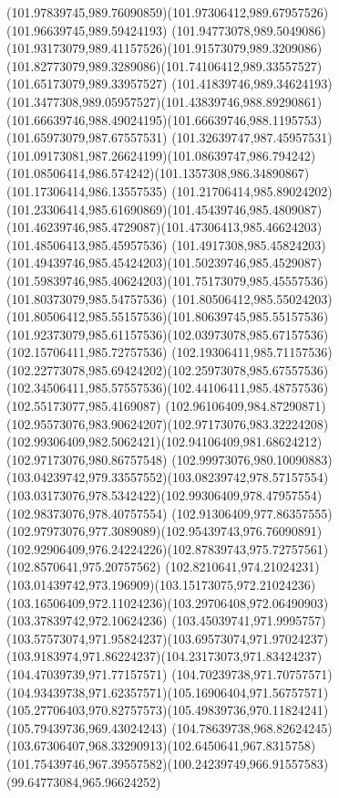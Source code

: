 {{  \curveto(101.97839745,989.76090859)(101.97306412,989.67957526)(101.96639745,989.59424193)
  \curveto(101.94773078,989.5049086)(101.93173079,989.41157526)(101.91573079,989.3209086)
  \curveto(101.82773079,989.3289086)(101.74106412,989.33557527)(101.65173079,989.33957527)
  \curveto(101.41839746,989.34624193)(101.3477308,989.05957527)(101.43839746,988.89290861)
  \curveto(101.66639746,988.49024195)(101.66639746,988.1195753)(101.65973079,987.67557531)
  \curveto(101.32639747,987.45957531)(101.09173081,987.26624199)(101.08639747,986.794242)
  \curveto(101.08506414,986.574242)(101.1357308,986.34890867)(101.17306414,986.13557535)
  \curveto(101.21706414,985.89024202)(101.23306414,985.61690869)(101.45439746,985.4809087)
  \curveto(101.46239746,985.4729087)(101.47306413,985.46624203)(101.48506413,985.45957536)
  \curveto(101.4917308,985.45824203)(101.49439746,985.45424203)(101.50239746,985.4529087)
  \curveto(101.59839746,985.40624203)(101.75173079,985.45557536)(101.80373079,985.54757536)
  \curveto(101.80506412,985.55024203)(101.80506412,985.55157536)(101.80639745,985.55157536)
  \curveto(101.92373079,985.61157536)(102.03973078,985.67157536)(102.15706411,985.72757536)
  \curveto(102.19306411,985.71157536)(102.22773078,985.69424202)(102.25973078,985.67557536)
  \curveto(102.34506411,985.57557536)(102.44106411,985.48757536)(102.55173077,985.4169087)
  \curveto(102.96106409,984.87290871)(102.95573076,983.90624207)(102.97173076,983.32224208)
  \curveto(102.99306409,982.5062421)(102.94106409,981.68624212)(102.97173076,980.86757548)
  \curveto(102.99973076,980.10090883)(103.04239742,979.33557552)(103.08239742,978.57157554)
  \curveto(103.03173076,978.5342422)(102.99306409,978.47957554)(102.98373076,978.40757554)
  \curveto(102.91306409,977.86357555)(102.97973076,977.3089089)(102.95439743,976.76090891)
  \curveto(102.92906409,976.24224226)(102.87839743,975.72757561)(102.8570641,975.20757562)
  \curveto(102.8210641,974.21024231)(103.01439742,973.196909)(103.15173075,972.21024236)
  \curveto(103.16506409,972.11024236)(103.29706408,972.06490903)(103.37839742,972.10624236)
  \curveto(103.45039741,971.9995757)(103.57573074,971.95824237)(103.69573074,971.97024237)
  \curveto(103.9183974,971.86224237)(104.23173073,971.83424237)(104.47039739,971.77157571)
  \curveto(104.70239738,971.70757571)(104.93439738,971.62357571)(105.16906404,971.56757571)
  \curveto(105.27706403,970.82757573)(105.49839736,970.11824241)(105.79439736,969.43024243)
  \curveto(104.78639738,968.82624245)(103.67306407,968.33290913)(102.6450641,967.8315758)
  \curveto(101.75439746,967.39557582)(100.24239749,966.91557583)(99.64773084,965.96624252)
}}
